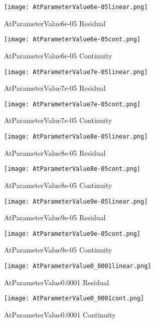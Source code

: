 \documentclass[12pt]{article}
\begin{document}
\begin{figure}[H]
	\texttt{[image: AtParameterValue6e-05linear.png]}
	\caption{AtParameterValue6e-05 Residual}
	\label{AtParameterValue6e-05linear}
\end{figure}
\begin{figure}[H]
	\texttt{[image: AtParameterValue6e-05cont.png]}
	\caption{AtParameterValue6e-05 Continuity}
	\label{AtParameterValue6e-05cont}
\end{figure}
\begin{figure}[H]
	\texttt{[image: AtParameterValue7e-05linear.png]}
	\caption{AtParameterValue7e-05 Residual}
	\label{AtParameterValue7e-05linear}
\end{figure}
\begin{figure}[H]
	\texttt{[image: AtParameterValue7e-05cont.png]}
	\caption{AtParameterValue7e-05 Continuity}
	\label{AtParameterValue7e-05cont}
\end{figure}
\begin{figure}[H]
	\texttt{[image: AtParameterValue8e-05linear.png]}
	\caption{AtParameterValue8e-05 Residual}
	\label{AtParameterValue8e-05linear}
\end{figure}
\begin{figure}[H]
	\texttt{[image: AtParameterValue8e-05cont.png]}
	\caption{AtParameterValue8e-05 Continuity}
	\label{AtParameterValue8e-05cont}
\end{figure}
\begin{figure}[H]
	\texttt{[image: AtParameterValue9e-05linear.png]}
	\caption{AtParameterValue9e-05 Residual}
	\label{AtParameterValue9e-05linear}
\end{figure}
\begin{figure}[H]
	\texttt{[image: AtParameterValue9e-05cont.png]}
	\caption{AtParameterValue9e-05 Continuity}
	\label{AtParameterValue9e-05cont}
\end{figure}
\begin{figure}[H]
	\texttt{[image: AtParameterValue0\_0001linear.png]}
	\caption{AtParameterValue0.0001 Residual}
	\label{AtParameterValue0_0001linear}
\end{figure}
\begin{figure}[H]
	\texttt{[image: AtParameterValue0\_0001cont.png]}
	\caption{AtParameterValue0.0001 Continuity}
	\label{AtParameterValue0_0001cont}
\end{figure}
\end{document}
